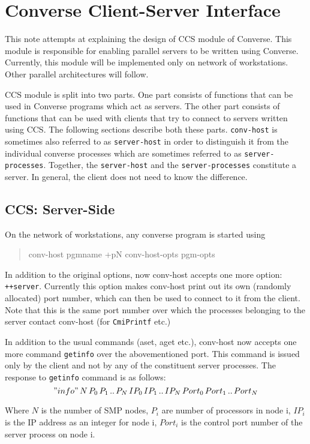 \chapter{Converse Client-Server Interface}

This note attempts at explaining the design of CCS module of
Converse. This module is responsible for enabling parallel
servers to be written using Converse. Currently, this module
will be implemented only on network of workstations. Other
parallel architectures will follow.

CCS module is split into two parts. One part consists of
functions that can be used in Converse programs which act as
servers. The other part consists of functions that can be used
with clients that try to connect to servers written using
CCS. The following sections describe both these parts. {\tt conv-host} 
is sometimes also referred to as {\tt server-host} 
in order to distinguish it from the individual converse processes which 
are sometimes referred to as {\tt server-processes}. Together, the 
{\tt server-host} and the {\tt  server-processes} constitute a
server. In general, the client does not need to know the
difference.


\section{CCS: Server-Side}


On the network of workstations, any converse program is started using
\begin{quotation} conv-host pgmname +pN conv-host-opts pgm-opts \end{quotation}
In addition to the original options, now conv-host accepts one more option:
{\tt ++server}. Currently this option makes conv-host print out its own
(randomly allocated) port number, which can then be used to connect to it from
the client. Note that this is the same port number over which the processes
belonging to the server contact conv-host (for {\tt CmiPrintf} etc.)

In addition to the usual commands (aset, aget etc.), conv-host now accepts one
more command {\tt getinfo} over the abovementioned port. This command is issued
only by the client and not by any of the constituent server processes. The
response to {\tt getinfo} command is as follows:
\["info" \, N \, P_{0} \,  P_{1} \, .. \, P_{N} \, IP_{0} \, IP_{1} \, .. \, 
IP_{N} \, Port_{0} \, Port_{1} \, .. \, Port_{N} \]

Where \(N\)  is the number of SMP nodes, \(P_{i}\)  are number of processors in
node i, \(IP_{i}\) is the IP address as an integer for node i, \(Port_{i}\) is
the control port number of the server process on node i.


